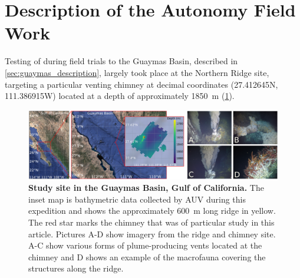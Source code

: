 \section{Description of the Autonomy Field Work}
Testing of \PHORTEX during field trials to the Guaymas Basin, described in \cref{sec:guaymas_description}, largely took place at the Northern Ridge site, targeting a particular venting chimney at decimal coordinates (27.412645N, 111.386915W) located at a depth of approximately \SI{1850}{\meter} (\cref{fig:autonomy_site}). 

\begin{figure}[h!]
    \centering
    \includegraphics[width=\columnwidth]{figures/site_summary.png}
    \caption[Study sit in the Guaymas Basin, Gulf of California]{\textbf{Study site in the Guaymas Basin, Gulf of California.} The inset map is bathymetric data collected by AUV \Sentry during this expedition and shows the approximately \SI{600}{\meter} long ridge in yellow. The red star marks the chimney that was of particular study in this article. Pictures A-D show imagery from the ridge and chimney site. A-C show various forms of plume-producing vents located at the chimney and D shows an example of the macrofauna covering the structures along the ridge.}
    \label{fig:autonomy_site}
\end{figure}


